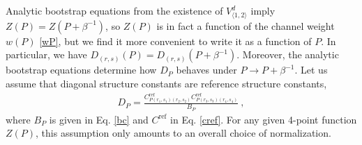 \documentclass[12pt, a4paper]{article}
\theoremstyle{break}
\begin{document}
Analytic bootstrap equations from the existence of $V^d_{\langle 1,2\rangle}$ imply $Z(P)=Z(P+\beta^{-1})$, so $Z(P)$ is in fact a function of the channel weight $w(P)$ \eqref{wP}, but we find it more convenient to write it as a function of $P$. In particular, we have $D_{(r,s)}(P)=D_{(r,s)}(P+\beta^{-1})$. Moreover, the analytic bootstrap equations 
determine how $D_P$ behaves under $P\to P+\beta^{-1}$. Let us assume that diagonal structure constants are reference structure constants,
\begin{align}
 D_P = \frac{C^\text{ref}_{P(r_1,s_1)(r_2,s_2)}C^\text{ref}_{P(r_3,s_3)(r_4,s_4)}}{B_P}\ ,
\end{align}
where $B_P$ is given in Eq. \eqref{bc} and $C^\text{ref}$ in Eq. \eqref{cref}. For any given 4-point function $Z(P)$, this assumption only amounts to an overall choice of normalization. 
\end{document}
